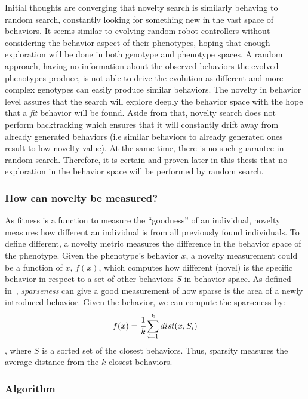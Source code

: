 Initial thoughts are converging that novelty search is similarly behaving to random search, constantly looking for something new in the vast space of behaviors. It seems similar to evolving random robot controllers without considering the behavior aspect of their phenotypes, hoping that enough exploration will be done in both genotype and phenotype spaces. A random approach, having no information about the observed behaviors the evolved phenotypes produce, is not able to drive the evolution as different and more complex genotypes can easily produce similar behaviors. The novelty in behavior level assures that the search will explore deeply the behavior space with the hope that a \emph{fit} behavior will be found. Aside from that, novelty search does not perform backtracking which ensures that it will constantly drift away from already generated behaviors (i.e similar behaviors to already generated ones result to low novelty value). At the same time, there is no such guarantee in random search. Therefore, it is certain and proven later in this thesis that no exploration in the behavior space will be performed by random search.



\subsubsection*{How can novelty be measured?}

As fitness is a function to measure the ``goodness'' of an individual, novelty measures how different an individual is from all previously found individuals. To define different, a novelty metric measures the difference in the behavior space of the phenotype. Given the phenotype's behavior $x$, a novelty measurement could be a function of $x$, $f(x)$, which computes how different (novel) is the specific behavior in respect to a set of other behaviors $S$ in behavior space.  As defined in~\citep{lehman2008exploiting,lehman2011abandoning}, \emph{sparseness} can give a good measurement of how sparse is the area of a newly introduced behavior. Given the behavior, we can compute the sparseness by:
\begin{equation}
\label{sparsenessEquation}
f(x) = \cfrac{1}{k} \sum_{i=1}^{k} dist(x, S_i)
\end{equation}
, where $S$ is a sorted set of the closest behaviors. Thus, sparsity measures the average distance from the $k$-closest behaviors.


\subsubsection*{Algorithm}

